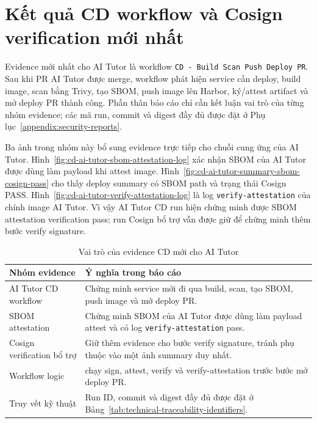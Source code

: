 \section{Kết quả CD workflow và Cosign verification mới nhất}

Evidence mới nhất cho AI Tutor là workflow \texttt{CD - Build Scan Push Deploy PR}. Sau khi PR AI Tutor được merge, workflow phát hiện service cần deploy, build image, scan bằng Trivy, tạo SBOM, push image lên Harbor, ký/attest artifact và mở deploy PR thành công. Phần thân báo cáo chỉ cần kết luận vai trò của từng nhóm evidence; các mã run, commit và digest đầy đủ được đặt ở Phụ lục~\ref{appendix:security-reports}.

Ba ảnh trong nhóm này bổ sung evidence trực tiếp cho chuỗi cung ứng của AI Tutor. Hình~\ref{fig:cd-ai-tutor-sbom-attestation-log} xác nhận SBOM của AI Tutor được dùng làm payload khi attest image. Hình~\ref{fig:cd-ai-tutor-summary-sbom-cosign-pass} cho thấy deploy summary có SBOM path và trạng thái Cosign PASS. Hình~\ref{fig:cd-ai-tutor-verify-attestation-log} là log \texttt{verify-attestation} của chính image AI Tutor. Vì vậy AI Tutor CD run hiện chứng minh được SBOM attestation verification pass; run Cosign bổ trợ vẫn được giữ để chứng minh thêm bước verify signature.

\begin{table}[H]
\centering
\caption{Vai trò của evidence CD mới cho AI Tutor}
\label{tab:cosign-verification-evidence}
\begin{tabularx}{\textwidth}{|p{}|Y|}
\hline
\textbf{Nhóm evidence} & \textbf{Ý nghĩa trong báo cáo} \\
\hline
AI Tutor CD workflow & Chứng minh service mới đi qua build, scan, tạo SBOM, push image và mở deploy PR. \\
SBOM attestation & Chứng minh SBOM của AI Tutor được dùng làm payload attest và có log \texttt{verify-attestation} pass. \\
Cosign verification bổ trợ & Giữ thêm evidence cho bước verify signature, tránh phụ thuộc vào một ảnh summary duy nhất. \\
Workflow logic &  chạy sign, attest, verify và verify-attestation trước bước mở deploy PR. \\
Truy vết kỹ thuật & Run ID, commit và digest đầy đủ được đặt ở Bảng~\ref{tab:technical-traceability-identifiers}. \\
\hline
\end{tabularx}
\end{table}


